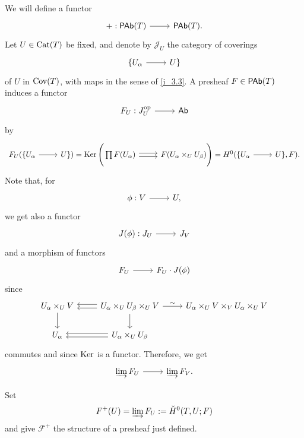 \documentclass [11 pt, oneside] {article}
\begin{document}
We will define a functor 
\[
\begin{tikzcd}
	+ : \catn{PAb}(\mathscr{T})\ar[r]& \catn{PAb}(\mathscr{T}).
\end{tikzcd}
\]
Let $U\in \Cat(\mathscr{T})$ be fixed, and denote by $\mathscr{J}_{U}$ the category of coverings 
\[
\begin{tikzcd}
	\{U_{\alpha}\ar[r]& U\}
\end{tikzcd}
\]
of $U$ in $\Cov(\mathscr{T})$, with maps in the sense of \cref{i_3.3}.
A presheaf $\mathscr{F}\in \catn{PAb}(\mathscr{T})$ induces a functor
\[
\begin{tikzcd}
	\mathscr{F}_{U} : \mathscr{J}_{U}\op \ar[r]& \catn{Ab}
\end{tikzcd}
\]
by
\[
\begin{tikzcd}
	\mathscr{F}_{U}(\{U_{\alpha}\ar[r]& U\}) = \Ker\Bigg ( \prod \mathscr{F}(U_{\alpha}) \ar[r,shift right=0.5 ex] \ar[r,shift left = 0.5 ex] & \mathscr{F}(U_{\alpha}\times_{U}U_{\beta})  \Bigg) = H^{0}(\{U_{\alpha}\ar[r]& U\}, \mathscr{F}).
\end{tikzcd}
\]
Note that, for
\[
\begin{tikzcd}
	\phi : V\ar[r]& U,
\end{tikzcd}
\]
we get also a functor
\[
\begin{tikzcd}
	\mathscr{J}(\phi) :  \mathscr{J}_{U}\ar[r]& \mathscr{J}_{V}
\end{tikzcd}
\]
and a morphism of functors
\[
\begin{tikzcd}
	\mathscr{F}_U \ar[r]& \mathscr{F}_{U}\cdot \mathscr{J}(\phi)
\end{tikzcd}
\]
since 
\[
\begin{tikzcd}
	U_{\alpha}\times_{U}V \ar[d] & U_{\alpha}\times_{U} U_{\beta}\times_{U} V\ar[l,shift right = 0.5 ex] \ar[l, shift left = 0.5 ex] \ar[r,"\sim"]\ar[d] & U_{\alpha}\times_{U} V\times_{V} U_{\alpha}\times_{U} V\\
	U_{\alpha}&U_{\alpha}\times_{U}U_{\beta}\ar[l, shift right=0.5 ex]\ar[l,shift left = 0.5 ex]
\end{tikzcd}
\]
commutes and since $\Ker$ is a functor. Therefore, we get 
\[
\begin{tikzcd}
	\varinjlim \mathscr{F}_{U}\ar[r]& \varinjlim \mathscr{F}_{V}.
\end{tikzcd}
\]

Set 
\begin{align*}
	\mathscr{F}^{+}(U) = \varinjlim  \mathscr{F}_{U} := \check H^{0}(\mathscr{T},U;\mathscr{F})
\end{align*}
and give $\mathscr{F}^{+}$ the structure of a presheaf just defined.
\end{document}
